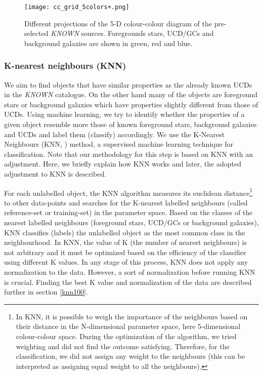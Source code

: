 \documentclass[fleqn,usenatbib]{mnras}
\begin{document}
\begin{figure}
\centering
  \texttt{[image: cc\_grid\_5colors+.png]}
  \caption{Different projections of the 5-D colour-colour diagram of the pre-selected \textit{KNOWN} sources. Foregrounds stars, UCD/GCs and background galaxies are shown in green, red and blue.}
\label{5dcc}
\end{figure}

\subsubsection{K-nearest neighbours (KNN)}

We aim to find objects that have similar properties as the already known UCDs in the \textit{KNOWN} catalogue. On the other hand many of the objects are foreground stars or background galaxies which have properties slightly different from those of UCDs. Using machine learning, we try to identify whether the properties of a given object resemble more those of known foreground stars, background galaxies and UCDs and label them (classify) accordingly. We use the K-Nearest Neighbours (KNN, \citealp{knn}) method, a supervised machine learning technique for classification. Note that our methodology for this step is based on KNN with an adjustment. Here, we briefly explain how KNN works and later, the adopted adjustment to KNN is described.

For each unlabelled object, the KNN algorithm measures its euclidean distance\footnote{In KNN, it is possible to weigh the importance of the neighbours based on their distance in the N-dimensional parameter space, here 5-dimensional colour-colour space. During the optimization of the algorithm, we tried weighting and did not find the outcome satisfying. Therefore, for the classification, we did not assign any weight to the neighbours (this can be interpreted as assigning equal weight to all the neighbours).} to other data-points and searches for the K-nearest labelled neighbours (called reference-set or training-set) in the parameter space. Based on the classes of the nearest labelled neighbours (foreground stars, UCD/GCs or background galaxies), KNN classifies (labels) the unlabelled object as the most common class in the neighbourhood. In KNN, the value of K (the number of nearest neighbours) is not arbitrary and it must be optimized based on the efficiency of the classifier using different K values. In any stage of this process, KNN does not apply any normalization to the data. However, a sort of normalization before running KNN is crucial. Finding the best K value and normalization of the data are described further in section \ref{knn100}.
\end{document}

